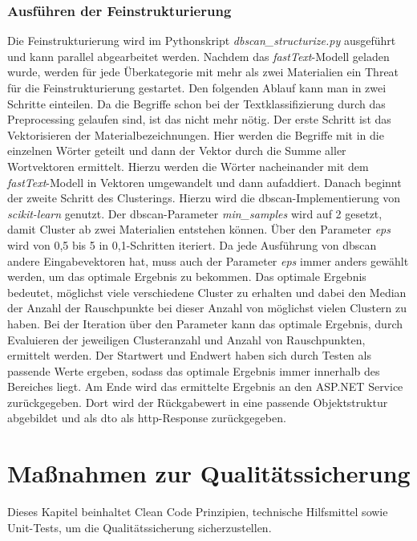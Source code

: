 \subsection{Ausführen der Feinstrukturierung}
\label{c:implementation:clustering}
Die Feinstrukturierung wird im Pythonskript \textit{dbscan\_structurize.py} ausgeführt und kann parallel abgearbeitet werden. Nachdem das \textit{fastText}-Modell geladen wurde, werden für jede Überkategorie mit mehr als zwei Materialien ein Threat für die Feinstrukturierung gestartet. Den folgenden Ablauf kann man in zwei Schritte einteilen. Da die Begriffe schon bei der Textklassifizierung durch das Preprocessing gelaufen sind, ist das nicht mehr nötig. Der erste Schritt ist das Vektorisieren der Materialbezeichnungen. Hier werden die Begriffe mit  in die einzelnen Wörter geteilt und dann der Vektor durch die Summe aller Wortvektoren ermittelt. Hierzu werden die Wörter nacheinander mit dem \textit{fastText}-Modell in Vektoren umgewandelt und dann aufaddiert. Danach beginnt der zweite Schritt des Clusterings. Hierzu wird die \ac{dbscan}-Implementierung von \textit{scikit-learn} \citep{scikit-learn} genutzt. Der \ac{dbscan}-Parameter \textit{min\_samples} wird auf 2 gesetzt, damit Cluster ab zwei Materialien entstehen können. Über den Parameter \textit{eps} wird von 0,5 bis 5 in 0,1-Schritten iteriert. Da jede Ausführung von \ac{dbscan} andere Eingabevektoren hat, muss auch der Parameter \textit{eps} immer anders gewählt werden, um das optimale Ergebnis zu bekommen. Das optimale Ergebnis bedeutet, möglichst viele verschiedene Cluster zu erhalten und dabei den Median der Anzahl der Rauschpunkte bei dieser Anzahl von möglichst vielen Clustern zu haben. Bei der Iteration über den Parameter kann das optimale Ergebnis, durch Evaluieren der jeweiligen Clusteranzahl und Anzahl von Rauschpunkten, ermittelt werden. Der Startwert und Endwert haben sich durch Testen als passende Werte ergeben, sodass das optimale Ergebnis immer innerhalb des Bereiches liegt. Am Ende wird das ermittelte Ergebnis an den ASP.NET Service zurückgegeben. Dort wird der Rückgabewert in eine passende Objektstruktur abgebildet und als \ac{dto} als \ac{http}-Response zurückgegeben.

\chapter{Maßnahmen zur Qualitätssicherung}
\label{c:qs}
Dieses Kapitel beinhaltet Clean Code Prinzipien, technische Hilfsmittel sowie Unit-Tests, um die Qualitätssicherung sicherzustellen.


